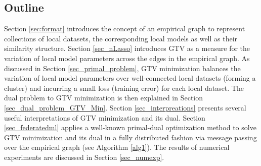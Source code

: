 \documentclass[lettersize,journal]{IEEEtran}
\begin{document}
\subsection{Outline} 
Section \ref{sec:format} introduces the concept of an empirical graph to represent collections of local 
datasets, the corresponding local models as well as their similarity structure. 
Section \ref{sec_nLasso} 
introduces GTV as a measure for the variation of local model parameters across the edges in 
the empirical graph. As discussed in Section \ref{sec_primal_problem}, GTV minimization balances  
the variation of local model parameters over well-connected local datasets (forming a cluster) and incurring 
a small loss (training error) for each local dataset. The dual problem to GTV minimization is then 
explained in Section \ref{sec_dual_problem_GTV_Min}. Section \ref{sec_interpreations} presents several 
useful interpretations of GTV minimization and its dual. 
Section \ref{sec_federatedml} applies a well-known primal-dual optimization method 
to solve GTV minimization and its dual in a fully distributed fashion via message passing over the empirical graph (see Algorithm \ref{alg1}). 
The results of numerical experiments are discussed in Section \ref{sec_numexp}. 
\end{document}
